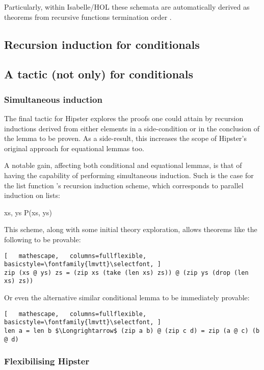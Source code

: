 Particularly, within Isabelle/HOL these schemata are automatically derived as theorems from recursive functions termination order \cite{krauss-term}.
 
 
\subsection{Recursion induction for conditionals}


\subsection{A tactic (not only) for conditionals}

\subsubsection*{Simultaneous induction}

The final tactic for Hipster explores the proofs one could attain by recursion inductions derived from either elements in a side-condition or in the conclusion of the lemma to be proven.
%
As a side-result, this increases the scope of Hipster's original approach for equational lemmas too.

A notable gain, affecting both conditional and equational lemmas, is that of having the capability of performing simultaneous induction.
%
Such is the case for the list function 's recursion induction scheme, which corresponds to parallel induction on lists:

  {\forall xs, \; ys \;\; P\;(xs,\; ys)}

\noindent This scheme, along with some initial theory exploration, allows theorems like the following to be provable:

\begin{lstlisting}[   mathescape,   columns=fullflexible,   basicstyle=\fontfamily{lmvtt}\selectfont, ]
zip (xs @ ys) zs = (zip xs (take (len xs) zs)) @ (zip ys (drop (len xs) zs))
\end{lstlisting}

\noindent Or even the alternative similar conditional lemma to be immediately provable:

\begin{lstlisting}[   mathescape,   columns=fullflexible,   basicstyle=\fontfamily{lmvtt}\selectfont, ]
len a = len b $\Longrightarrow$ (zip a b) @ (zip c d) = zip (a @ c) (b @ d)
\end{lstlisting}


\subsubsection*{Flexibilising Hipster}





